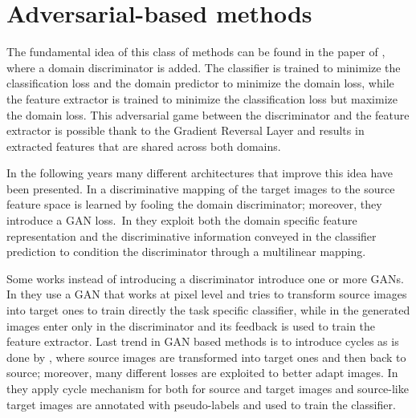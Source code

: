 \section{Adversarial-based methods}
    The fundamental idea of this class of methods can be found in the paper of \cite[Ganin at al.]{Ganin2015}, where a domain discriminator is added. The classifier is trained to minimize the classification loss and the domain predictor to minimize the domain loss, while the feature extractor 
    is trained to minimize the classification loss but maximize the domain loss. 
    This adversarial game between the discriminator and the feature extractor is possible thank to the Gradient Reversal Layer and results in extracted features 
    that are shared across both domains.
    
    In the following years many different architectures that improve this idea have been presented. 
    In \cite[Tzeng at al.]{Tzeng2017} a discriminative mapping of the target images to the source feature space is learned by fooling the domain discriminator;
    moreover, they introduce a GAN loss.\
    In \cite[Long at al.]{Long2017} they exploit both the domain specific feature representation and the discriminative information conveyed in the classifier prediction 
    to condition the discriminator through a multilinear mapping.
    
    Some works instead of introducing a discriminator introduce one or more GANs.
    In \cite[Bousmalis at al.]{Bousmalis2016} they use a GAN that works at pixel level and tries to transform source images into target ones to train directly the task specific classifier,
    while in \cite[Sankaranarayanan at al.]{Sankaranarayanan2017} the generated images enter only in the discriminator and its feedback is used to train the feature extractor.
    Last trend in GAN based methods is to introduce cycles as is done by \cite[Hoffman at al.]{Hoffman2017}, where source images are transformed into target ones and then back to source;
    moreover, many different losses are exploited to better adapt images. 
    In \cite[Russo at al.]{Russo2017} they apply cycle mechanism for both for source and target images and source-like target images are annotated with pseudo-labels 
    and used to train the classifier.
    
